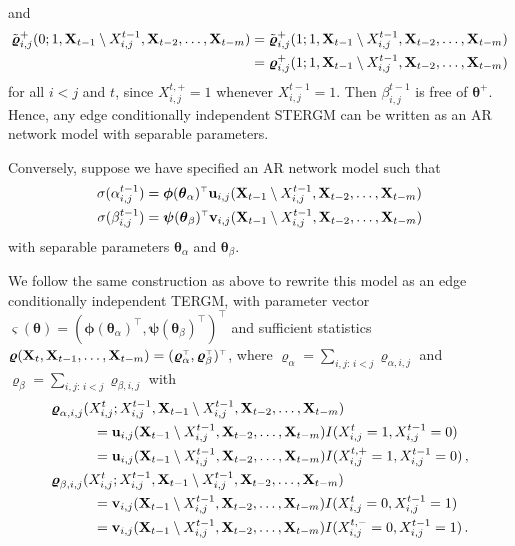 \documentclass[12pt]{article}
\newcommand{\bvarsigma}{\boldsymbol \varsigma}
\newcommand{\bvarrho}{\boldsymbol \varrho}
\newcommand{\bpsi}{\boldsymbol \psi}
\newcommand{\bphi}{\boldsymbol \phi}
\newcommand{\btheta}{\boldsymbol \theta}
\def\T{{\scriptscriptstyle \top} }
\newcommand{\bu}{{\mathbf u}}
\newcommand{\bv}{{\mathbf v}}
\newcommand{\0}{{\bf 0}}
\begin{document}
and
\begin{align*}
    \tilde{\bvarrho}^+_{i,j}(0 ; 1 , {\bf X}_{t-1} \setminus X_{i,j}^{t-1}, {\bf X}_{t-2}, \ldots, {\bf X}_{t-m}) &= \tilde{\bvarrho}^+_{i,j}(1 ; 1 , {\bf X}_{t-1} \setminus X_{i,j}^{t-1}, {\bf X}_{t-2}, \ldots, {\bf X}_{t-m} ) \\
    &= \bvarrho^+_{i,j}(1 ; 1 , {\bf X}_{t-1} \setminus X_{i,j}^{t-1}, {\bf X}_{t-2}, \ldots, {\bf X}_{t-m} )
\end{align*}
for all $i < j$ and $t$, since $X_{i,j}^{t,+}=1$ whenever $X_{i,j}^{t-1}=1$.
Then $\beta_{i,j}^{t-1}$ is free of $\btheta^+$.
Hence, any edge conditionally independent STERGM can be written as an AR network model with separable parameters.

Conversely, suppose we have specified an AR network model such that
\begin{align*}
  \sigma(\alpha_{i,j}^{t-1}) &= \bphi(\btheta_{\alpha})^{\T} \bu_{i,j}({\bf X}_{t-1} \setminus X_{i,j}^{t-1}, {\bf X}_{t-2}, \ldots, {\bf X}_{t-m} ) \\
  \sigma(\beta_{i,j}^{t-1}) &= \bpsi(\btheta_{\beta})^{\T} \bv_{i,j}({\bf X}_{t-1} \setminus X_{i,j}^{t-1}, {\bf X}_{t-2}, \ldots, {\bf X}_{t-m} )
\end{align*}
with separable parameters $\btheta_{\alpha}$ and $\btheta_{\beta}$.

We follow the same construction as above to rewrite this model as an edge conditionally independent TERGM, with parameter vector $\bvarsigma(\btheta) = (\bphi(\btheta_{\alpha})^{\T}, \bpsi(\btheta_{\beta})^{\T})^{\T}$ and sufficient statistics $
  \bvarrho({\bf X}_t , {\bf X}_{t-1}, \ldots, {\bf X}_{t-m}) = (\bvarrho_{\alpha}^{\T} , \bvarrho_{\beta}^{\T})^{\T}$, where
$\bvarrho_{\alpha} = \sum_{i,j:\,i < j} \bvarrho_{\alpha,i,j}$ and $\bvarrho_{\beta} = \sum_{i,j:\,i < j} \bvarrho_{\beta,i,j}$ with
\begin{align}
  &\bvarrho_{\alpha,i,j}(X_{i,j}^t ; X_{i,j}^{t-1}, {\bf X}_{t-1} \setminus X_{i,j}^{t-1}, {\bf X}_{t-2}, \ldots, {\bf X}_{t-m}) \notag \\
  &~~~~~~~~~= \bu_{i,j}({\bf X}_{t-1} \setminus X_{i,j}^{t-1}, {\bf X}_{t-2}, \ldots, {\bf X}_{t-m} )I(X_{i,j}^{t}=1, X_{i,j}^{t-1}=0) \notag \\
  &~~~~~~~~~= \bu_{i,j}({\bf X}_{t-1} \setminus X_{i,j}^{t-1}, {\bf X}_{t-2}, \ldots, {\bf X}_{t-m} )I(X_{i,j}^{t,+}=1, X_{i,j}^{t-1}=0) \,, \label{stergm_statA} \\
  &\bvarrho_{\beta,i,j}(X_{i,j}^t ; X_{i,j}^{t-1}, {\bf X}_{t-1} \setminus X_{i,j}^{t-1}, {\bf X}_{t-2}, \ldots, {\bf X}_{t-m}) \notag \\&~~~~~~~~~=\bv_{i,j}({\bf X}_{t-1} \setminus X_{i,j}^{t-1}, {\bf X}_{t-2}, \ldots, {\bf X}_{t-m} )I(X_{i,j}^{t}=0, X_{i,j}^{t-1}=1)\notag \\
  &~~~~~~~~~=\bv_{i,j}({\bf X}_{t-1} \setminus X_{i,j}^{t-1}, {\bf X}_{t-2}, \ldots, {\bf X}_{t-m} )I(X_{i,j}^{t,-}=0, X_{i,j}^{t-1}=1)\,. \label{stergm_statB}
\end{align}
\end{document}
